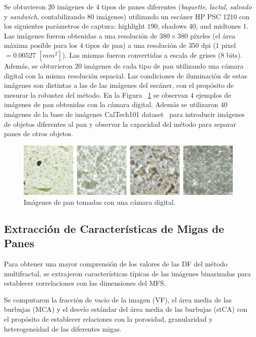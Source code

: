 Se obtuvieron $20$ imágenes de $4$ tipos de panes diferentes ({\em baguette}, {\em lactal}, {\em salvado} y {\em sandwich}, contabilizando $80$ imágenes) utilizando un escáner HP PSC 1210 con los siguientes parámetros de captura:  highlight $190$, shadows $40$, and midtones $1$.
Las imágenes fueron obtenidas a una resolución de $380\times 380$ píxeles (el área máxima posible para los $4$ tipos de pan) a una resolución de $350$ dpi ($1$ pixel $= 0.00527$ $[mm^{2}]$).
Las mismas fueron convertidas a escala de grises ($8$ bits).
Además, se obtuvieron $20$ imágenes de cada tipo de pan utilizando una cámara digital con la misma resolución espacial.
Las condiciones de iluminación de estas imágenes son distintas a las de las imágenes del escáner, con el propósito de mesurar la robustez del método.
En la Figura ~\ref{fig:camera} se observan $4$ ejemplos de imágenes de pan obtenidas con la cámara digital. Además se utilizaron $40$ imágenes de la base de imágenes CalTech101 dataset~\cite{FeiFei04} para introducir imágenes de objetos diferentes al pan y observar la capacidad del método para separar panes de otros objetos.

\begin{figure}[h!]
\centering
\includegraphics[width=13cm]{figures/pancamara}
\caption{Imágenes de pan tomadas con una cámara digital.}
\label{fig:camera}
\end{figure}

\subsection{Extracción de Características de Migas de Panes}
Para obtener una mayor comprensión de los valores de las DF del método multifractal, se extrajeron características típicas de las imágenes binarizadas para establecer correlaciones con las dimensiones del MFS.

Se computaron la fracción de vacío de la imagen (\acrshort{VF}), el área media de las burbujas (\acrshort{MCA}) y el desvío estándar del área media de las burbujas (\acrshort{stCA}) con el propósito de establecer relaciones con la porosidad, granularidad y heterogeneidad de las diferentes migas.


